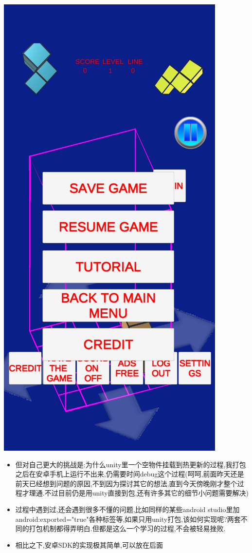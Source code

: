 \documentclass[9pt, b5paper]{article}
\begin{document}
\includegraphics[width=.9\linewidth]{./pic/unityToAndroid_20221125_171932.png}

\begin{itemize}
\item 但对自己更大的挑战是:为什么unity里一个空物件挂载到热更新的过程,我打包之后在安卓手机上运行不出来,仍需要时间debug这个过程(呵呵,前面昨天还是前天已经想到问题的原因,不到因为探讨其它的想法,直到今天傍晚刚才整个过程才理通.不过目前仍是用unity直接到包,还有许多其它的细节小问题需要解决)
\item 过程中遇到过,还会遇到很多不懂的问题,比如同样的某些android studio里加android:exported="true"各种标签等,如果只用unity打包,该如何实现呢?两套不同的打包机制都得弄明白.但都是这么一个学习的过程,不会被轻易挫败.
\item 相比之下,安卓SDK的实现极其简单,可以放在后面
\end{itemize}
\end{document}
